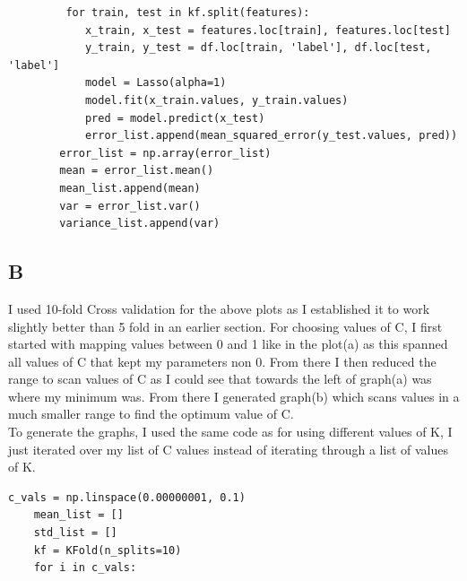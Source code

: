 \documentclass[11pt]{article} %
\begin{document}
 \begin{verbatim}
         for train, test in kf.split(features):
            x_train, x_test = features.loc[train], features.loc[test]
            y_train, y_test = df.loc[train, 'label'], df.loc[test, 'label']
            model = Lasso(alpha=1)
            model.fit(x_train.values, y_train.values)
            pred = model.predict(x_test)
            error_list.append(mean_squared_error(y_test.values, pred))
        error_list = np.array(error_list)
        mean = error_list.mean()
        mean_list.append(mean)
        var = error_list.var()
        variance_list.append(var)
 \end{verbatim}
\subsection{B}
\begin{figure}[h]
\qquad
{}
\end{figure}
I used 10-fold Cross validation for the above plots as I established it to work slightly better than 5 fold in an earlier section. For choosing values of C, I first started with mapping values between 0 and 1 like in the plot(a) as this spanned all values of C that kept my parameters non 0. From there I then reduced the range to scan values of C as I could see that towards the left of graph(a) was where my minimum was. From there I generated graph(b) which scans values in a much smaller range to find the optimum value of C.
\\
To generate the graphs, I used the same code as for using different values of K, I just iterated over my list of C values instead of iterating through a list of values of K.
\begin{verbatim}
c_vals = np.linspace(0.00000001, 0.1)
    mean_list = []
    std_list = []
    kf = KFold(n_splits=10)
    for i in c_vals:
\end{verbatim}
\end{document}
